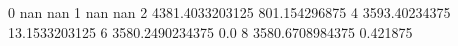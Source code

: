 0 nan nan
1 nan nan
2 4381.4033203125 801.154296875
4 3593.40234375 13.1533203125
6 3580.2490234375 0.0
8 3580.6708984375 0.421875
